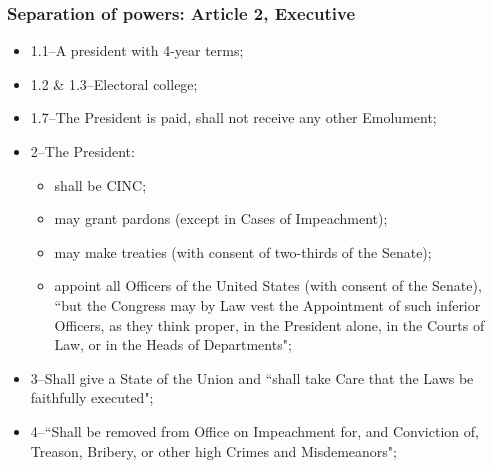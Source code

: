 \documentclass[aspectratio=169]{beamer}
\theoremstyle{principle}
\begin{document}
\begin{frame}
\frametitle{Separation of powers: Article 2, Executive}


\begin{itemize} 
\item 1.1--A president with 4-year terms;
\bigskip

\item 1.2 \& 1.3--Electoral college;
\bigskip

\item 1.7--The President is paid, shall not receive any other Emolument;
\bigskip

\item 2--The President:
\begin{itemize} 
\item shall be CINC;
\item may grant pardons (except in Cases of Impeachment);
\item may make treaties (with consent of two-thirds of the Senate);
\item appoint all Officers of the United States (with consent of the Senate), ``but the Congress may by Law vest the Appointment of such inferior Officers, as they think proper, in the President alone, in the Courts of Law, or in the Heads of Departments";
\end{itemize}
\item 3--Shall give a State of the Union and ``shall take Care that the Laws be faithfully executed";
\bigskip
\item 4--``Shall be removed from Office on Impeachment for, and Conviction of, Treason, Bribery, or other high Crimes and Misdemeanors";
\end{itemize}

\end{frame}
\end{document}
